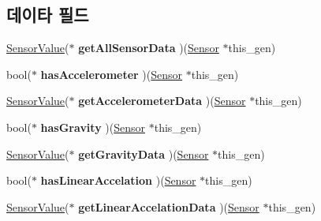 \subsection*{데이타 필드}
\begin{DoxyCompactItemize}
\item 
\hypertarget{struct___sensor_a10026b8aacaf2448a2647560f31a40b1}{\hyperlink{struct___sensor_value}{Sensor\-Value}($\ast$ {\bfseries get\-All\-Sensor\-Data} )(\hyperlink{struct___sensor}{Sensor} $\ast$this\-\_\-gen)}\label{struct___sensor_a10026b8aacaf2448a2647560f31a40b1}

\item 
\hypertarget{struct___sensor_a3aacbc5c5f5025bc0982dfcfc8e5967b}{bool($\ast$ {\bfseries has\-Accelerometer} )(\hyperlink{struct___sensor}{Sensor} $\ast$this\-\_\-gen)}\label{struct___sensor_a3aacbc5c5f5025bc0982dfcfc8e5967b}

\item 
\hypertarget{struct___sensor_a5866d3f8765e5a67b7f0eaf635944b97}{\hyperlink{struct___sensor_value}{Sensor\-Value}($\ast$ {\bfseries get\-Accelerometer\-Data} )(\hyperlink{struct___sensor}{Sensor} $\ast$this\-\_\-gen)}\label{struct___sensor_a5866d3f8765e5a67b7f0eaf635944b97}

\item 
\hypertarget{struct___sensor_af64c8e156f8a62ca32300241bf59db90}{bool($\ast$ {\bfseries has\-Gravity} )(\hyperlink{struct___sensor}{Sensor} $\ast$this\-\_\-gen)}\label{struct___sensor_af64c8e156f8a62ca32300241bf59db90}

\item 
\hypertarget{struct___sensor_acce3cf55e78289afb1333549395e8dd6}{\hyperlink{struct___sensor_value}{Sensor\-Value}($\ast$ {\bfseries get\-Gravity\-Data} )(\hyperlink{struct___sensor}{Sensor} $\ast$this\-\_\-gen)}\label{struct___sensor_acce3cf55e78289afb1333549395e8dd6}

\item 
\hypertarget{struct___sensor_a53840ffe13c9a9087444a0af8982e36f}{bool($\ast$ {\bfseries has\-Linear\-Accelation} )(\hyperlink{struct___sensor}{Sensor} $\ast$this\-\_\-gen)}\label{struct___sensor_a53840ffe13c9a9087444a0af8982e36f}

\item 
\hypertarget{struct___sensor_a651649ccae8becc5398a39bf70a4a044}{\hyperlink{struct___sensor_value}{Sensor\-Value}($\ast$ {\bfseries get\-Linear\-Accelation\-Data} )(\hyperlink{struct___sensor}{Sensor} $\ast$this\-\_\-gen)}\label{struct___sensor_a651649ccae8becc5398a39bf70a4a044}


\end{DoxyCompactItemize}

